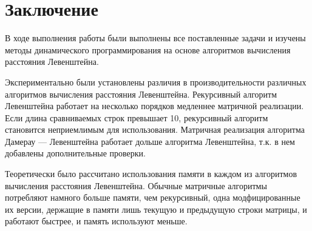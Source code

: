 \chapter*{Заключение}

В ходе выполнения работы были выполнены все поставленные задачи и изучены методы динамического программирования на основе алгоритмов вычисления расстояния Левенштейна.

Экспериментально были установлены различия в производительности различных алгоритмов вычисления расстояния Левенштейна. Рекурсивный алгоритм Левенштейна работает на несколько порядков медленнее матричной реализации. Если длина сравниваемых строк превышает 10, рекурсивный алгоритм становится неприемлимым для использования. Матричная реализация алгоритма Дамерау — Левенштейна работает дольше алгоритма Левенштейна, т.к. в нем добавлены дополнительные проверки.

Теоретически было рассчитано использования памяти в каждом из алгоритмов вычисления расстояния Левенштейна. Обычные матричные алгоритмы потребляют намного больше памяти, чем рекурсивный, одна модфицированные их версии, держащие в памяти лишь текущую и предыдущую строки матрицы, и работают быстрее, и память используют меньше.